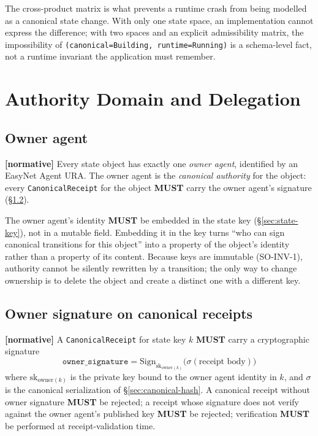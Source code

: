 \documentclass[11pt,a4paper]{article}
\newcommand{\normsv}{\textcolor{normativecolor}{\textbf{[normative]}}\xspace}
\theoremstyle{definition}
\begin{document}
\begin{notebox}
The cross-product matrix is what prevents a runtime crash from
being modelled as a canonical state change. With only one state
space, an implementation cannot express the difference; with two
spaces and an explicit admissibility matrix, the impossibility of
\texttt{(canonical=Building, runtime=Running)} is a schema-level
fact, not a runtime invariant the application must remember.
\end{notebox}

\section{Authority Domain and Delegation}
\label{sec:authority}

\subsection{Owner agent}

\normsv{}
Every state object has exactly one \emph{owner agent}, identified
by an EasyNet Agent URA. The owner agent is the \emph{canonical
authority} for the object: every \texttt{CanonicalReceipt} for the
object \textbf{MUST} carry the owner agent's signature
(\S\ref{sec:owner-sig}).

The owner agent's identity \textbf{MUST} be embedded in the
state key (\S\ref{sec:state-key}), not in a mutable field.
Embedding it in the key turns ``who can sign canonical
transitions for this object'' into a property of the object's
identity rather than a property of its content. Because keys are
immutable (SO-INV-1), authority cannot be silently rewritten by a
transition; the only way to change ownership is to delete the
object and create a distinct one with a different key.

\subsection{Owner signature on canonical receipts}
\label{sec:owner-sig}

\normsv{}
A \texttt{CanonicalReceipt} for state key $k$ \textbf{MUST} carry
a cryptographic signature
\[
    \texttt{owner\_signature} = \mathrm{Sign}_{\mathrm{sk}_{\mathrm{owner}(k)}}\!\bigl(\sigma(\text{receipt body})\bigr)
\]
where $\mathrm{sk}_{\mathrm{owner}(k)}$ is the private key bound to
the owner agent identity in $k$, and $\sigma$ is the canonical
serialization of \S\ref{sec:canonical-hash}. A canonical receipt
without owner signature \textbf{MUST} be rejected; a receipt whose
signature does not verify against the owner agent's published key
\textbf{MUST} be rejected; verification \textbf{MUST} be performed
at receipt-validation time.
\end{document}

